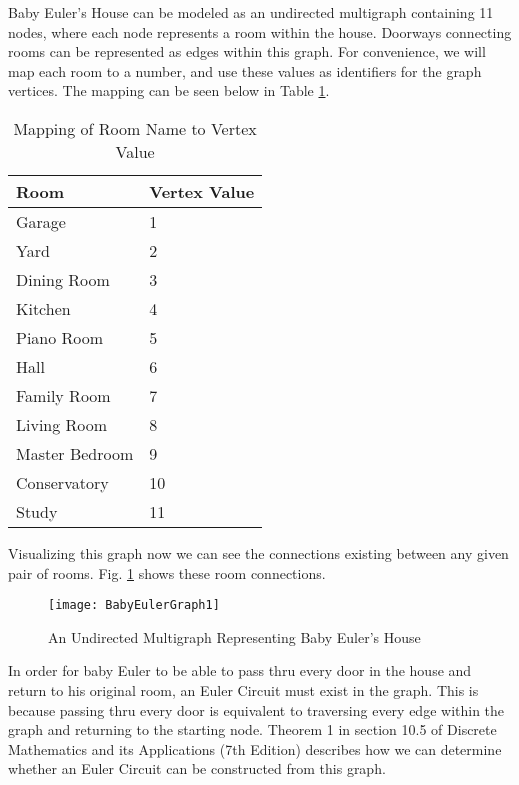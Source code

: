 \newcommand{\EC}{Euler Circuit }



Baby Euler's House can be modeled as an undirected multigraph containing 11 nodes, where each node represents a room within the house. Doorways connecting rooms can be represented as edges within this graph. For convenience, we will map each room to a number, and use these values as identifiers for the graph vertices. The mapping can be seen below in Table \ref{tab:RoomMapping}.\\

\begin{table}[ht]
\begin{center}
\begin{tabular}{l|l}
Room & Vertex Value \\
\hline
Garage & 1 \\
Yard & 2 \\
Dining Room & 3 \\
Kitchen & 4 \\
Piano Room & 5 \\
Hall & 6 \\
Family Room & 7 \\
Living Room & 8 \\
Master Bedroom & 9 \\
Conservatory & 10 \\
Study & 11 \\
\end{tabular}
\end{center}
\caption{Mapping of Room Name to Vertex Value}
\label{tab:RoomMapping}
\end{table}

\newpage
\noindent
Visualizing this graph now we can see the connections existing between any given pair of rooms. Fig. \ref{fig:EulerHouse1} shows these room connections.

\begin{figure}[ht]
\centering
    \texttt{[image: BabyEulerGraph1]}
    \caption{An Undirected Multigraph Representing Baby Euler's House}
    \label{fig:EulerHouse1}
\end{figure}

\noindent
In order for baby Euler to be able to pass thru every door in the house and return to his original room, an Euler Circuit must exist in the graph. This is because passing thru every door is equivalent to traversing every edge within the graph and returning to the starting node. Theorem 1 in section 10.5 of Discrete Mathematics and its Applications (7th Edition) describes how we can determine whether an \EC can be constructed from this graph.

